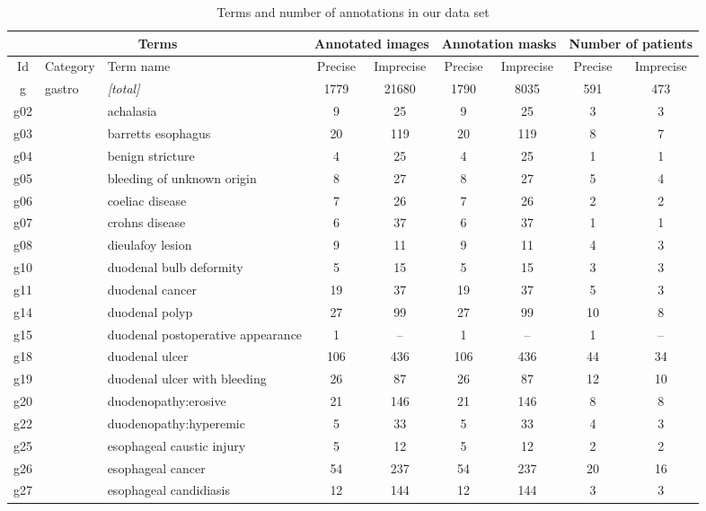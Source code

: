 \documentclass[preprint]{article}
\begin{document}
\begin{longtable}{c|l|l|c|c|c|c|c|c}
\caption{Terms and number of annotations in our data set}\label{tbl2} \label{tab:terms} \\


\multicolumn{3}{c|}{Terms} &
\multicolumn{2}{c|}{Annotated images} & 
\multicolumn{2}{c|}{Annotation masks} & 
\multicolumn{2}{c}{Number of patients} \\
\hline
Id & Category & Term name & Precise & Imprecise & Precise & Imprecise & Precise & Imprecise \\

\hline



g & gastro & \textit{[total]} & 1779 & 21680 & 1790 & 8035 & 591 & 473 \\ 
g02 &  & achalasia & 9 & 25 & 9 & 25 & 3 & 3 \\ 
g03 &  & barretts esophagus & 20 & 119 & 20 & 119 & 8 & 7 \\ 
g04 &  & benign stricture & 4 & 25 & 4 & 25 & 1 & 1 \\ 
g05 &  & bleeding of unknown origin & 8 & 27 & 8 & 27 & 5 & 4 \\ 
g06 &  & coeliac disease & 7 & 26 & 7 & 26 & 2 & 2 \\ 
g07 &  & crohns disease & 6 & 37 & 6 & 37 & 1 & 1 \\ 
g08 &  & dieulafoy lesion & 9 & 11 & 9 & 11 & 4 & 3 \\ 
g10 &  & duodenal bulb deformity & 5 & 15 & 5 & 15 & 3 & 3 \\ 
g11 &  & duodenal cancer & 19 & 37 & 19 & 37 & 5 & 3 \\ 
g14 &  & duodenal polyp & 27 & 99 & 27 & 99 & 10 & 8 \\ 
g15 &  & duodenal postoperative appearance & 1 & -- & 1 & -- & 1 & -- \\ 
g18 &  & duodenal ulcer & 106 & 436 & 106 & 436 & 44 & 34 \\ 
g19 &  & duodenal ulcer with bleeding & 26 & 87 & 26 & 87 & 12 & 10 \\ 
g20 &  & duodenopathy:erosive & 21 & 146 & 21 & 146 & 8 & 8 \\ 
g22 &  & duodenopathy:hyperemic & 5 & 33 & 5 & 33 & 4 & 3 \\ 
g25 &  & esophageal caustic injury & 5 & 12 & 5 & 12 & 2 & 2 \\ 
g26 &  & esophageal cancer & 54 & 237 & 54 & 237 & 20 & 16 \\ 
g27 &  & esophageal candidiasis & 12 & 144 & 12 & 144 & 3 & 3 \\ 

\end{longtable}
\end{document}
